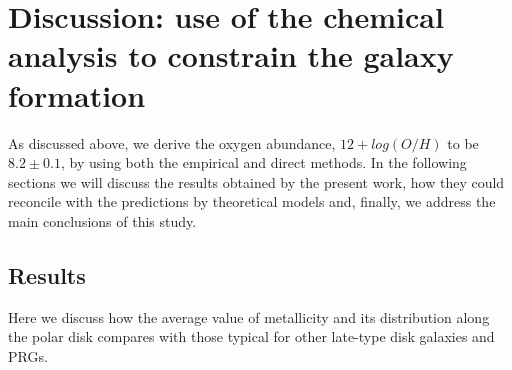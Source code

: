 \documentclass[12pt,preprint]{aastex}
\begin{document}


\section{Discussion: use of the chemical analysis to constrain the galaxy
formation}\label{disc}

As discussed above, we derive the oxygen abundance, $12+log(O/H)$ to be $8.2 \pm 0.1$, by using
both the empirical and direct methods. In the
following sections we will discuss the results obtained by the present
work, how they could reconcile with the predictions by theoretical
models and, finally, we address the main conclusions of this study.

\subsection{Results}\label{res}
Here we discuss how the average value of metallicity and its
distribution along the polar disk compares with those typical for other
late-type disk galaxies and PRGs.
\end{document}
